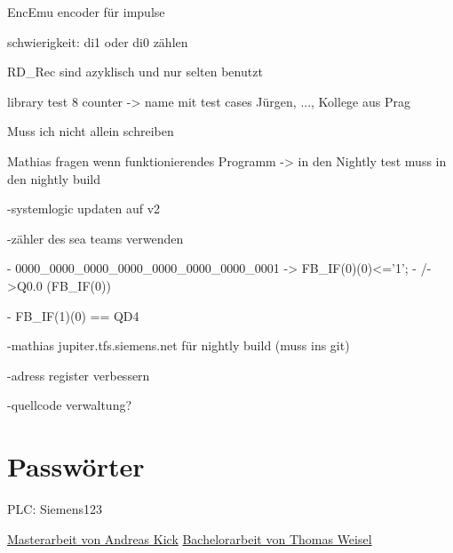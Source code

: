 EncEmu encoder für impulse 

schwierigkeit: di1 oder di0 zählen

RD\_Rec sind azyklisch und nur selten benutzt

library test 8 counter -> name mit test cases Jürgen, ..., Kollege aus Prag

Muss ich nicht allein schreiben

Mathias fragen wenn funktionierendes Programm -> in den Nightly test muss in den nightly build

-systemlogic updaten auf v2 

-zähler des sea teams verwenden

- 0000\_0000\_0000\_0000\_0000\_0000\_0000\_0001 -> FB\_IF(0)(0)<='1';
-    /->Q0.0                          (FB\_IF(0))

- FB\_IF(1)(0) == QD4

-mathias jupiter.tfs.siemens.net für nightly build (muss ins git)

-adress register verbessern

-quellcode verwaltung?
\chapter{Passwörter}

PLC: Siemens123

\href{https://siemens.sharepoint.com/teams/P0000045/Backbone/Abschlussarbeiten/Masterarbeit_Andreas_Kick.pdf}{Masterarbeit von Andreas Kick}
\href{https://siemens.sharepoint.com/teams/P0000045/Backbone/Abschlussarbeiten/Bachelorarbeit_Thomas_Weisel.pdf}{Bachelorarbeit von Thomas Weisel}